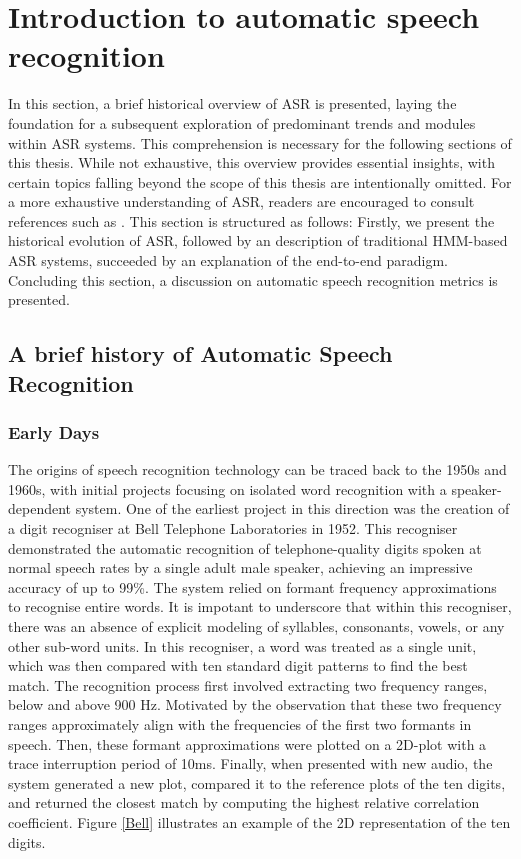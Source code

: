 \section{Introduction to automatic speech recognition}%
In this section, a brief historical overview of \ac{ASR} is presented, laying the foundation for a subsequent exploration of predominant trends and modules within \ac{ASR} systems. This comprehension is necessary for the following sections of this thesis. While not exhaustive, this overview provides essential insights, with certain topics falling beyond the scope of this thesis are intentionally omitted. For a more exhaustive understanding of \ac{ASR}, readers are encouraged to consult references such as \cite{benzeghiba2007automatic, karpagavalli2016review, arora2012automatic}. This section is structured as follows: Firstly, we present the historical evolution of \ac{ASR}, followed by an description of traditional HMM-based \ac{ASR} systems, succeeded by an explanation of the end-to-end paradigm. Concluding this section, a discussion on automatic speech recognition metrics is presented.

\subsection{A brief history of Automatic Speech Recognition}

\subsubsection{Early Days}

The origins of speech recognition technology can be traced back to the 1950s and 1960s, with initial projects focusing on isolated word recognition with a speaker-dependent system. One of the earliest project in this direction was the creation of a digit recogniser at Bell Telephone Laboratories in 1952. This recogniser demonstrated the automatic recognition of telephone-quality digits spoken at normal speech rates by a single adult male speaker, achieving an impressive accuracy of up to 99\%. The system relied on formant frequency approximations to recognise entire words. It is impotant to underscore that within this recogniser, there was an absence of explicit modeling of syllables, consonants, vowels, or any other sub-word units. In this recogniser, a word was treated as a single unit, which was then compared with ten standard digit patterns to find the best match. The recognition process first involved extracting two frequency ranges, below and above 900 \ac{Hz}. Motivated by the observation that these two frequency ranges approximately align with the frequencies of the first two formants in speech. Then, these formant approximations were plotted on a 2D-plot with a trace interruption period of 10ms. Finally, when presented with new audio, the system generated a new plot, compared it to the reference plots of the ten digits, and returned the closest match by computing the highest relative correlation coefficient. Figure \ref{Bell} illustrates an example of the 2D representation of the ten digits.



